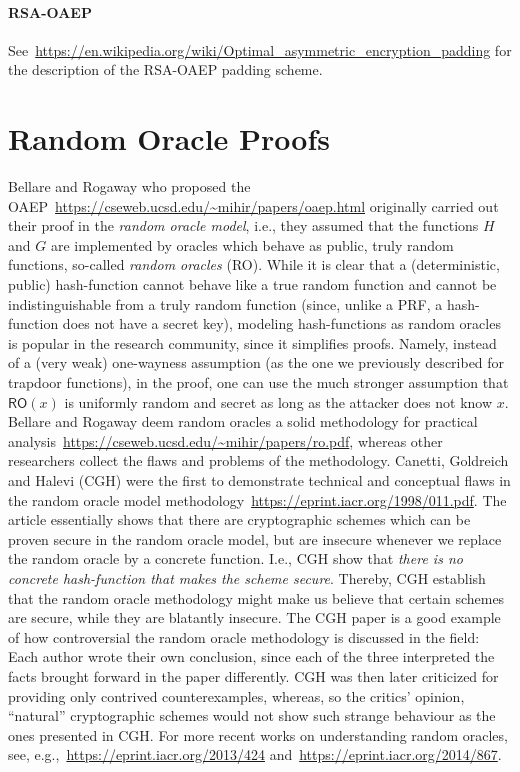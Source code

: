 \documentclass[a4paper,table,dvipsnames]{article}
\theoremstyle{definition}
\begin{document}
\paragraph{RSA-OAEP}
See~\url{https://en.wikipedia.org/wiki/Optimal_asymmetric_encryption_padding} for
the description of the RSA-OAEP padding scheme.



\section{Random Oracle Proofs}\label{sec:rom}
Bellare and Rogaway who proposed the OAEP~\url{https://cseweb.ucsd.edu/~mihir/papers/oaep.html} originally
carried out their proof in the \emph{random oracle model}, i.e., they assumed that the functions $H$ and $G$
are implemented by oracles which behave as public, truly random functions, so-called \emph{random oracles} (RO). While it is clear that a (deterministic,
public) hash-function
 cannot behave like a true random function and cannot be indistinguishable from
a truly random function (since, unlike a PRF, a hash-function does not have a secret key),
modeling hash-functions as random oracles is popular in the research community, since it
simplifies proofs. Namely, instead of a (very weak) one-wayness assumption (as the one we
previously described for trapdoor functions), in the proof, one can use the much stronger
assumption that $\mathsf{RO}(x)$ is uniformly random and secret as long as the attacker does not know $x$. Bellare and Rogaway
deem random oracles a solid methodology for practical analysis~\url{https://cseweb.ucsd.edu/~mihir/papers/ro.pdf},
whereas other researchers collect the flaws and problems of the methodology. Canetti, Goldreich and Halevi (CGH) were the
first to demonstrate technical and conceptual flaws in the random oracle model methodology~\url{https://eprint.iacr.org/1998/011.pdf}.
The article essentially shows that there are cryptographic schemes which can be proven
secure in the random oracle model, but are insecure whenever we replace the random oracle
by a concrete function. I.e., CGH show that \emph{there is no concrete hash-function that
makes the scheme secure}. Thereby, CGH establish that the random oracle methodology might
make us believe that certain schemes are secure, while they are blatantly insecure. The CGH
paper is a good example of how controversial the random oracle methodology is discussed in
the field: Each author wrote their own conclusion, since each of the three interpreted the
facts brought forward in the paper differently. CGH was then later criticized for providing
only contrived counterexamples, whereas, so the critics' opinion, ``natural'' cryptographic
schemes would not show such strange behaviour as the ones presented in CGH. For more recent works on understanding random
oracles, see, e.g.,~\url{https://eprint.iacr.org/2013/424} and~\url{https://eprint.iacr.org/2014/867}.
\end{document}
